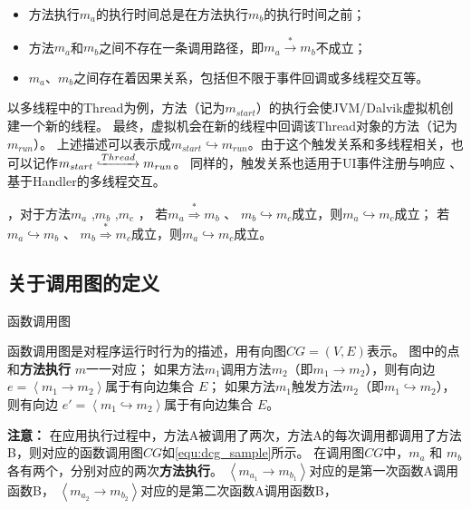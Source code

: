 	\begin{itemize}
		\setlength{\itemsep}{-5pt}
		\item  方法执行$m_a$的执行时间总是在方法执行$m_b$的执行时间之前；
		\item 方法$m_a$和$m_b$之间不存在一条调用路径，即$m_a \stackrel{\ast}{\to} m_b $不成立；
		\item $m_a$、$m_b$之间存在着因果关系，包括但不限于事件回调或多线程交互等。
	\end{itemize}


以多线程中的Thread为例，方法（记为$m_{start}$）的执行会使JVM/Dalvik虚拟机创建一个新的线程。
最终，虚拟机会在新的线程中回调该Thread对象的方法（记为$m_{run}$）。
上述描述可以表示成$m_{start} \hookrightarrow m_{run}$。由于这个触发关系和多线程相关，也可以记作$m_{start} \lhook\joinrel\xrightarrow{Thread}  m_{run} $。
同样的，触发关系也适用于UI事件注册与响应 、基于Handler的多线程交互。

，对于方法$m_a$ ,$m_b$ ,$m_c$ ，
若$m_a  \stackrel{\ast}{ \Rightarrow } m_b$ 、 $m_b \hookrightarrow m_c$成立，则$m_a \hookrightarrow m_c$成立；
若$m_a  \hookrightarrow m_b$ 、 $m_b \stackrel{\ast}{ \Rightarrow }  m_c$成立，则$m_a \hookrightarrow m_c$成立。

\subsection{关于调用图的定义}

\begin{Def}
	函数调用图%
\end{Def}	


	函数调用图是对程序运行时行为的描述，用有向图$CG = ( V , E)$表示。 图中的点和\textbf{方法执行} $m$一一对应；
	如果方法$m_1$调用方法$m_2$（即$m_1 \to m_2$），则有向边 $e = \left\langle m_1  \to m_2 \right\rangle $属于有向边集合 $E$；
	如果方法$m_1$触发方法$m_2$（即$m_1 \hookrightarrow m_2$），则有向边 $e' = \left\langle m_1  \hookrightarrow m_2 \right\rangle $属于有向边集合 $E$。 


\textbf{注意：}
在应用执行过程中，方法A被调用了两次，方法A的每次调用都调用了方法B，则对应的函数调用图$CG$如\autoref{equ:dcg_sample}所示。
在调用图$CG$中，$m_a$ 和 $m_b$ 各有两个，分别对应的两次\textbf{方法执行}。
$\left\langle m_{a_{1}} \to m_{b_{1}}\right\rangle $对应的是第一次函数A调用函数B，
$\left\langle m_{a_{2}} \to m_{b_{2}} \right\rangle    $对应的是第二次函数A调用函数B，

